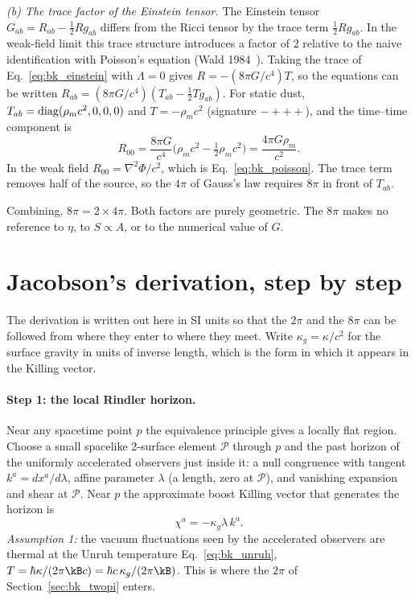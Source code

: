 \emph{(b) The trace factor of the Einstein tensor.} The Einstein tensor $G_{ab}=R_{ab}-\tfrac12Rg_{ab}$ differs from the Ricci tensor by the trace term
$\tfrac12Rg_{ab}$. In the weak-field limit this trace structure introduces a factor of $2$ relative to the naive identification with Poisson's equation
(Wald 1984~\cite{Wald1984}). Taking the trace of Eq.~\eqref{eq:bk_einstein} with $\Lambda=0$ gives $R=-(8\pi G/c^4)T$, so the equations can be written
$R_{ab}=(8\pi G/c^4)(T_{ab}-\tfrac12Tg_{ab})$. For static dust, $T_{ab}={\rm diag}(\rho_m c^2,0,0,0)$ and $T=-\rho_m c^2$ (signature $-+++$), and the time--time
component is
\begin{equation}
R_{00}=\frac{8\pi G}{c^4}\Big(\rho_m c^2-\tfrac12\rho_m c^2\Big)=\frac{4\pi G\rho_m}{c^2}.
\end{equation}
In the weak field $R_{00}=\nabla^2\Phi/c^2$, which is Eq.~\eqref{eq:bk_poisson}. The trace term removes half of the source, so the $4\pi$ of Gauss's law requires $8\pi$ in
front of $T_{ab}$. \derived

Combining, $8\pi=2\times4\pi$. Both factors are purely geometric. The $8\pi$ makes no reference to $\eta$, to $S\propto A$, or to the numerical value of $G$. \derived

\section{Jacobson's derivation, step by step}\label{sec:bk_jacobson}
The derivation is written out here in SI units so that the $2\pi$ and the $8\pi$ can be followed from where they enter to where they meet. Write
$\kappa_g=\kappa/c^2$ for the surface gravity in units of inverse length, which is the form in which it appears in the Killing vector.

\paragraph{Step 1: the local Rindler horizon.} Near any spacetime point $p$ the equivalence principle gives a locally flat region. Choose a small
spacelike 2-surface element $\mathcal P$ through $p$ and the past horizon of the uniformly accelerated observers just inside it: a null congruence with
tangent $k^a=dx^a/d\lambda$, affine parameter $\lambda$ (a length, zero at $\mathcal P$), and vanishing expansion and shear at $\mathcal P$. Near $p$ the
approximate boost Killing vector that generates the horizon is
\begin{equation}
\chi^a=-\kappa_g\lambda\,k^a .
\end{equation}
\emph{Assumption 1:} the vacuum fluctuations seen by the accelerated observers are thermal at the Unruh temperature Eq.~\eqref{eq:bk_unruh}, $T=\hbar\kappa/(2\pi\kB c)
=\hbar c\,\kappa_g/(2\pi\kB)$. This is where the $2\pi$ of Section~\ref{sec:bk_twopi} enters.

